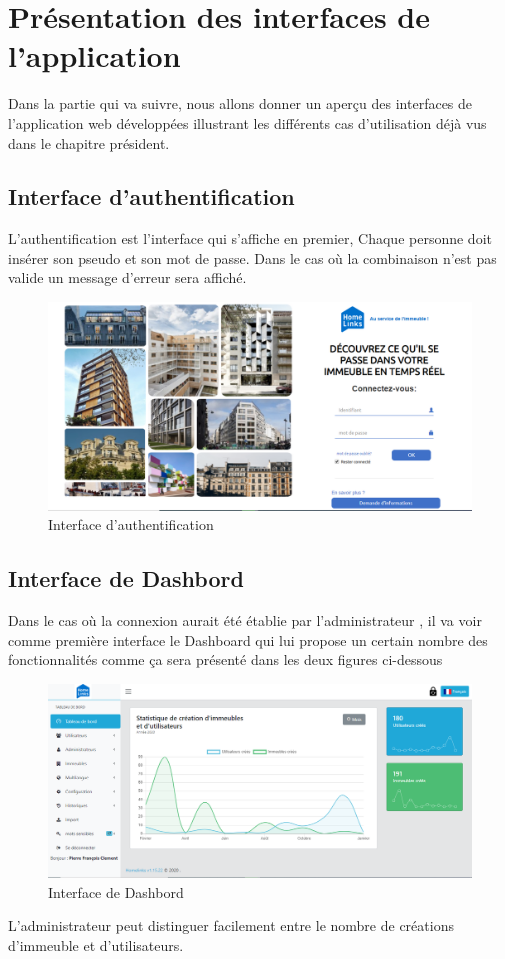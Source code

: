 \documentclass[a4paper,10pt]{book}
\begin{document}
\section{Présentation des interfaces de l’application }
\par \par Dans la partie qui va suivre, nous allons donner un aperçu des interfaces de l’application
web développées illustrant les différents cas d’utilisation déjà vus dans le chapitre président.


\subsection{Interface d'authentification}
L'authentification est l'interface qui s'affiche en premier, Chaque personne doit insérer son pseudo	 et son mot de passe. Dans le cas où la combinaison n'est pas valide un message d’erreur sera affiché.
\begin{figure}[!h]
\centering 
\includegraphics[width=1\textwidth]{auth.PNG}
\caption{Interface d'authentification}
\end{figure}
\subsection{Interface de Dashbord}
   Dans le cas où la connexion aurait été établie par l’administrateur , il va voir comme première interface le Dashboard qui lui propose un certain nombre des fonctionnalités comme ça sera présenté dans les deux figures ci-dessous 
\begin{figure}[!h]
\centering 
\includegraphics[width=1\textwidth]{dashbord.PNG}
\caption{Interface de Dashbord}
\end{figure}
L’administrateur peut distinguer facilement entre le nombre de créations d’immeuble et d’utilisateurs.  
\end{document}

